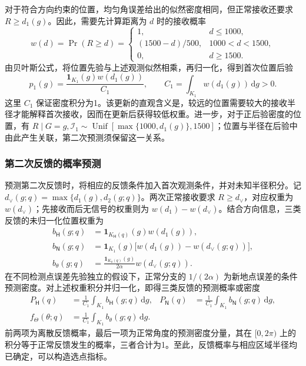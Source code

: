 \documentclass[UTF8,a4paper,zihao=-4,fontset=none]{ctexart}
\begin{document}
对于符合方向约束的位置，均匀角误差给出的似然密度相同，但正常接收还要求 \(R\ge d_1(g)\)。因此，需要先计算距离为 \(d\) 时的接收概率
\begin{equation}
 w(d)=\Pr(R\ge d)=
 \begin{cases}
 1,&d\le1000,\\
 (1500-d)/500,&1000<d<1500,\\
 0,&d\ge1500.
 \end{cases}
\label{eq:q2-pair-weight}
\end{equation}
由贝叶斯公式，将位置先验与上述观测似然相乘，再归一化，得到首次位置后验
\begin{equation}
 p_1(g)=\frac{\mathbf1_{K_1}(g)w(d_1(g))}{C_1},
 \qquad C_1=\int_{K_1}w(d_1(g))\,\mathrm dg>0.
\label{eq:q2-pair-posterior}
\end{equation}
这里 \(C_1\) 保证密度积分为1。该更新的直观含义是，较远的位置需要较大的接收半径才能解释首次接收，因而在更新后获得较低权重。进一步，对于正后验密度的位置，有 \(R\mid G=g,\mathcal I_1\sim\operatorname{Unif}[\max\{1000,d_1(g)\},1500]\)；位置与半径在后验中由此产生关联，第二次预测须保留这一关系。

\subsubsection{第二次反馈的概率预测}

预测第二次反馈时，将相应的反馈条件加入首次观测条件，并对未知半径积分。记 \(d_\vee(g;q)=\max\{d_1(g),d_2(g;q)\}\)。两次正常接收要求 \(R\ge d_\vee\)，对应权重为 \(w(d_\vee)\)；先接收而后无信号的权重则为 \(w(d_1)-w(d_\vee)\)。结合方向信息，三类反馈的未归一化位置权重为
\begin{equation}
\begin{aligned}
 b_{\mathsf H}(g;q)&=\mathbf1_{K_{\mathsf H}(q)}(g)w(d_1(g)),\\
 b_{\mathsf N}(g;q)&=\mathbf1_{K_1}(g)\bigl[w(d_1(g))-w(d_\vee(g;q))\bigr],\\
 b_\theta(g;q)&=\frac{\mathbf1_{K_\theta(q)}(g)}{2\alpha}w(d_\vee(g;q)).
\end{aligned}
\label{eq:q2-pair-feedback-weights}
\end{equation}
在不同检测点误差先验独立的假设下，正常分支的 \(1/(2\alpha)\) 为新地点误差的条件预测密度。对上述权重积分并归一化，即得三类反馈的预测概率或密度
\begin{equation}
\begin{aligned}
 P_{\mathsf H}(q)&=\frac{1}{C_1}\int_{K_1}b_{\mathsf H}(g;q)\,\mathrm dg,
 &P_{\mathsf N}(q)&=\frac{1}{C_1}\int_{K_1}b_{\mathsf N}(g;q)\,\mathrm dg,\\
 f_\Theta(\theta;q)&=\frac{1}{C_1}\int_{K_1}b_\theta(g;q)\,\mathrm dg.
\end{aligned}
\label{eq:q2-pair-prediction}
\end{equation}
前两项为离散反馈概率，最后一项为正常角度的预测密度分量，其在 \([0,2\pi)\) 上的积分等于正常反馈发生的概率，三者合计为1。至此，反馈概率与相应区域半径均已确定，可以构造选点指标。
\end{document}
